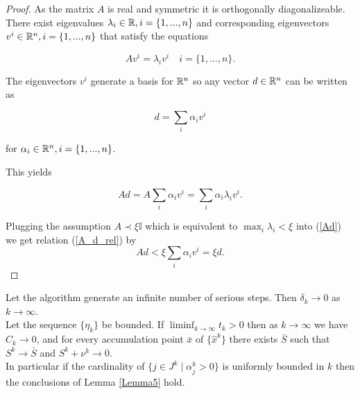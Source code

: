 \begin{proof}
	As the matrix \(A\) is real and symmetric it is orthogonally diagonalizeable.
	There exist eigenvalues \(\lambda_i \in \mathbb{R}, i = \{1,...,n\}\) and corresponding eigenvectors \(v^i \in \mathbb{R}^n, i = \{1,...,n\}\) that satisfy the equations
	
	\begin{equation*}
		Av^i= \lambda_iv^i \quad i = \{1,...,n\}.
		\label{A_d_rel}
	\end{equation*}
	
	The eigenvectors \(v^i\) generate a basis for \(\mathbb{R}^n\) so any vector \(d \in \mathbb{R}^n\) can be written as
	
	\[ d = \sum_{i} {\alpha_i v^i} \]
	
	for \(\alpha_i \in \mathbb{R}^n, i = \{1,...,n\}\).
	
	This yields
	
	\begin{equation}
		Ad = A \sum_i{\alpha_i v^i} = \sum_i \alpha_i \lambda_i v^i.
		\label{Ad}
	\end{equation}
	
	Plugging the assumption \(A \prec \xi \mathbb{I}\) which is equivalent to \(\max_i \lambda_i < \xi\) into (\ref{Ad})
	we get relation (\ref{A_d_rel}) by
		\[Ad < \xi \sum_i \alpha_i v^i = \xi d. \]

\end{proof}

\begin{theorem}
\label{theo_inf_ser_steps}
	Let the algorithm generate an infinite number of serious steps. Then \(\delta_k \to 0\) as \(k \to \infty\). \\
	Let the sequence \(\{\eta_k\}\) be bounded. If \(\liminf_{k \to \infty} t_k > 0\) then as \(k \to \infty\) we have \(C_k \to 0\), and for every accumulation point \(\bar{x}\) of \(\{\hat{x}^k\}\) there exists \(\bar{S}\) such that \(S^k \to \bar{S}\) and \(S^k + \nu^k \to 0\). \\
	In particular if the cardinality of \(\{j \in J^k\mid \alpha_j^k > 0\}\) is uniformly bounded in \(k\) then the conclusions of Lemma \ref{Lemma5} hold.
\end{theorem}

